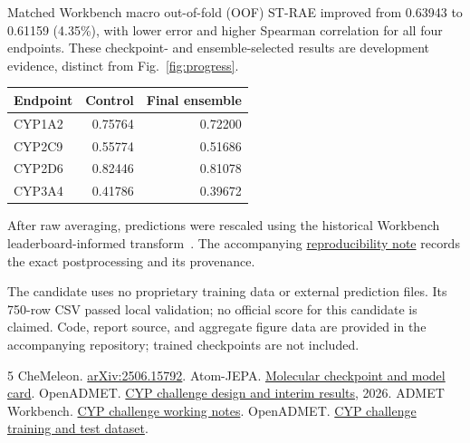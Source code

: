 \documentclass[10pt,twocolumn]{article}
\begin{document}
Matched Workbench macro out-of-fold (OOF) ST-RAE improved from 0.63943 to
0.61159 (4.35\%), with lower error and higher Spearman correlation for all
four endpoints. These checkpoint- and ensemble-selected results are
development evidence, distinct from Fig.~\ref{fig:progress}.

\begin{center}
\small
\begin{tabular}{lrr}
\toprule
Endpoint & Control & Final ensemble \\
\midrule
CYP1A2 & 0.75764 & 0.72200 \\
CYP2C9 & 0.55774 & 0.51686 \\
CYP2D6 & 0.82446 & 0.81078 \\
CYP3A4 & 0.41786 & 0.39672 \\
\bottomrule
\end{tabular}
\end{center}

After raw averaging, predictions were rescaled using the historical
Workbench leaderboard-informed transform~\cite{workbench}. The accompanying
\href{https://github.com/Somerra/somerra-openadmet-cyp/blob/main/report/reproducibility.md}{reproducibility note}
records the exact postprocessing and its provenance.

The candidate uses no proprietary training data or external
prediction files. Its 750-row CSV passed local validation; no official score
for this candidate is claimed. Code, report source, and aggregate figure data
are provided in the accompanying repository; trained checkpoints are not
included.

\begingroup
\small
\setlength{\parskip}{0pt}
\begin{thebibliography}{5}
\setlength{\itemsep}{0pt}
 CheMeleon. \href{https://arxiv.org/abs/2506.15792}{arXiv:2506.15792}.
 Atom-JEPA. \href{https://huggingface.co/atom-jepa/atom-jepa}{Molecular checkpoint and model card}.
 OpenADMET. \href{https://openadmet.ghost.io/halfway-through-the-openadmet-cyp-challenge/}{CYP challenge design and interim results}, 2026.
 ADMET Workbench. \href{https://supercowpowers.github.io/workbench/blogs/cyp_challenge/}{CYP challenge working notes}.
 OpenADMET. \href{https://huggingface.co/datasets/openadmet/cyp-challenge-train-test}{CYP challenge training and test dataset}.
\end{thebibliography}
\endgroup
\end{document}
